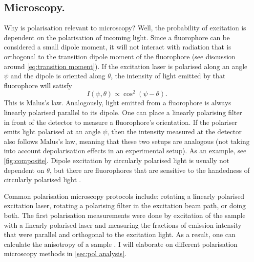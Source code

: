 \subsection{Microscopy.} Why is polarisation relevant to microscopy? Well, the probability of excitation is dependent on the polarisation of incoming light. Since a fluorophore can be considered a small dipole moment, it will not interact with radiation that is orthogonal to the transition dipole moment of the fluorophore (see discussion around \autoref{eq:transition moment}). If the excitation laser is polarised along an angle $ \psi $ and the dipole is oriented along $ \theta $, the intensity of light emitted by that fluorophore will satisfy 
\begin{equation}
	\label{eq:malus}
	I(\psi, \theta) \propto \cos^2(\psi-\theta).
\end{equation}
This is Malus's law. Analogously, light emitted from a fluorophore is always linearly polarised parallel to its dipole. One can place a linearly polarising filter in front of the detector to measure a fluorophore's orientation. If the polariser emits light polarised at an angle $ \psi $, then the intensity measured at the detector also follows Malus's law, meaning that these two setups are analogous (not taking into account depolarisation effects in an experimental setup). As an example, see \autoref{fig:composite}. Dipole excitation by circularly polarised light is usually not dependent on $ \theta $, but there are fluorophores that are sensitive to the handedness of circularly polarised light \cite{Takaishi2019}.

Common polarisation microscopy protocols include: rotating a linearly polarised excitation laser, rotating a polarising filter in the excitation beam path, or doing both. The first polarisation measurements were done by excitation of the sample with a linearly polarised laser and measuring the fractions of emission intensity that were parallel and orthogonal to the excitation light. As a result, one can calculate the anisotropy of a sample \cite{Camacho2019}. I will elaborate on different polarisation microscopy methods in \autoref{sec:pol analysis}. 

